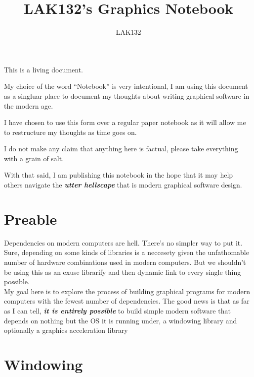 \documentclass{article}
\title{LAK132's Graphics Notebook}
\author{LAK132}
\begin{document}
\maketitle

This is a living document.

My choice of the word ``Notebook'' is very intentional,
I am using this document as a singluar place to document my thoughts about
writing graphical software in the modern age.

I have chosen to use this form over a regular paper notebook as it will allow
me to restructure my thoughts as time goes on.

I do not make any claim that anything here is factual,
please take everything with a grain of salt.

With that said, I am publishing this notebook in the hope that it may help
others navigate the \textit{\textbf{utter hellscape}} that is modern graphical
software design.

\pagebreak
\tableofcontents


\pagebreak
\section{Preable}
\label{sec:preamble}

Dependencies on modern computers are hell.
There's no simpler way to put it.
Sure, depending on some kinds of libraries is a neccesety given the
unfathomable number of hardware combinations used in modern computers.
But we shouldn't be using this as an exuse librarify and then dynamic link to
every single thing possible.
\\
My goal here is to explore the process of building graphical programs for
modern computers with the fewest number of dependencies.
The good news is that as far as I can tell,
\textit{\textbf{it is entirely possible}} to build simple modern software that
depends on nothing but the OS it is running under, a windowing library and
optionally a graphics acceleration library


\pagebreak
\section{Windowing}
\label{sec:windowing}
\end{document}
